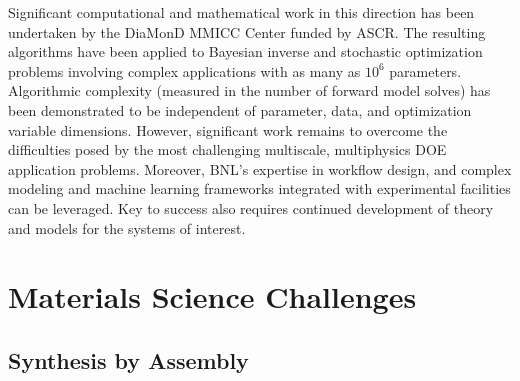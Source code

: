 \documentclass[11pt]{article}
\begin{document}
Significant computational and mathematical work in this direction has
been undertaken by the DiaMonD MMICC Center funded by ASCR. The
resulting algorithms have been applied to Bayesian inverse and
stochastic optimization problems involving complex applications with
as many as $10^6$ parameters.  Algorithmic complexity (measured in the
number of forward model solves) has been demonstrated to be
independent of parameter, data, and optimization variable dimensions.
However, significant work remains to overcome the difficulties posed
by the most challenging multiscale, multiphysics DOE application
problems.  Moreover, BNL's expertise in workflow design, and complex
modeling and machine learning frameworks integrated with experimental
facilities can be leveraged.  Key to success also requires continued
development of theory and models for the systems of interest.

\section{Materials Science Challenges}

\subsection{Synthesis by Assembly}
\end{document}
